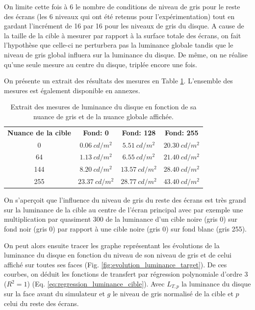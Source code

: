 	\par On limite cette fois à 6 le nombre de conditions de niveau de gris pour le reste des écrans (les 6 niveaux qui ont été retenus pour l'expérimentation) tout en gardant l'incrément de 16 par 16 pour les niveaux de gris du disque. A cause de la taille de la cible à mesurer par rapport à la surface totale des écrans, on fait l'hypothèse que celle-ci ne perturbera pas la luminance globale tandis que le niveau de gris global influera sur la luminance du disque. De même, on ne réalise qu'une seule mesure au centre du disque, triplée encore une fois.
	
	\par On présente un extrait des résultats des mesures en Table \ref{tab:extrait_mesure_luminance_target}. L'ensemble des mesures est également disponible en annexes.
	
	\begin{table}[h]	
		\centering
		\caption{Extrait des mesures de luminance du disque en fonction de sa nuance de gris et de la nuance globale affichée.}
		\label{tab:extrait_mesure_luminance_target}
		\small
		\begin{tabular}{cccc}
			\textbf{Nuance de la cible} & \textbf{Fond: 0} & \textbf{Fond: 128} & \textbf{Fond: 255}\\
			0 & $0.06~cd/m^2$ & $5.51~cd/m^2$ & $20.30~cd/m^2$\\
			64 & $1.13~cd/m^2$ & $6.55~cd/m^2$ & $21.40~cd/m^2$\\
			144 & $8.20~cd/m^2$ & $13.57~cd/m^2$ & $28.40~cd/m^2$\\
			255 & $23.37~cd/m^2$ & $28.77~cd/m^2$ & $43.40~cd/m^2$
		\end{tabular}
	\end{table}
	
	\par On s'aperçoit que l'influence du niveau de gris du reste des écrans est très grand sur la luminance de la cible au centre de l'écran principal avec par exemple une multiplication par quasiment 300 de la luminance d'un cible noire (gris 0) sur fond noir (gris 0) par rapport à une cible noire (gris 0) sur fond blanc (gris 255).
	
	\par On peut alors ensuite tracer les graphe représentant les évolutions de la luminance du disque en fonction du niveau de son niveau de gris et de celui affiché sur toutes ses faces (Fig. \ref{fig:evolution_luminance_target}). De ces courbes, on déduit les fonctions de transfert par régression polynomiale d'ordre 3 ($R^2 = 1$) (Eq. \ref{eq:regression_luminance_cible}). Avec $L_{T,p}$ la luminance du disque sur la face avant du simulateur et $g$ le niveau de gris normalisé de la cible et $p$ celui du reste des écrans.
	
